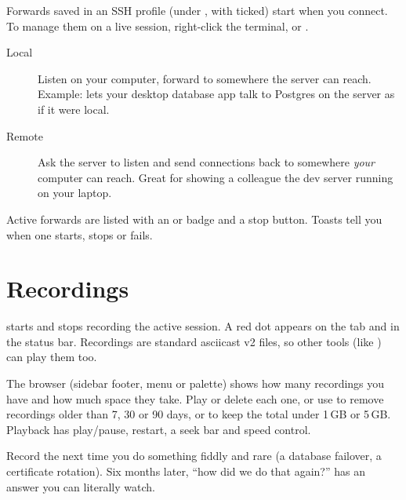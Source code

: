 Forwards saved in an SSH profile (under , with  ticked) start when you connect.
To manage them on a live session, right-click the terminal\then{}, or .

\begin{description}
  \item[Local \iArrow] Listen on your computer, forward to somewhere the server can reach.
        Example: \then{} lets your desktop database app talk to Postgres on
        the server as if it were local.
  \item[Remote ] Ask the server to listen and send connections back to somewhere \emph{your} computer can reach.
        Great for showing a colleague the dev server running on your laptop.
\end{description}

Active forwards are listed with an  or  badge and a stop button. Toasts tell you when one
starts, stops or fails.


\chapter{Recordings}\label{ch:recordings}

 starts and stops recording the active session. A red dot appears on the tab and  in
the status bar. Recordings are standard asciicast v2 files, so other tools (like ) can play them too.


The browser (sidebar footer,  menu or palette) shows how many recordings you have and how much space
they take. Play or delete each one, or use  to remove recordings older than 7, 30 or 90 days, or to keep
the total under 1\,GB or 5\,GB. Playback has play/pause, restart, a seek bar and speed control.

\begin{protip}
Record the next time you do something fiddly and rare (a database failover, a certificate rotation). Six months
later, ``how did we do that again?'' has an answer you can literally watch.
\end{protip}


